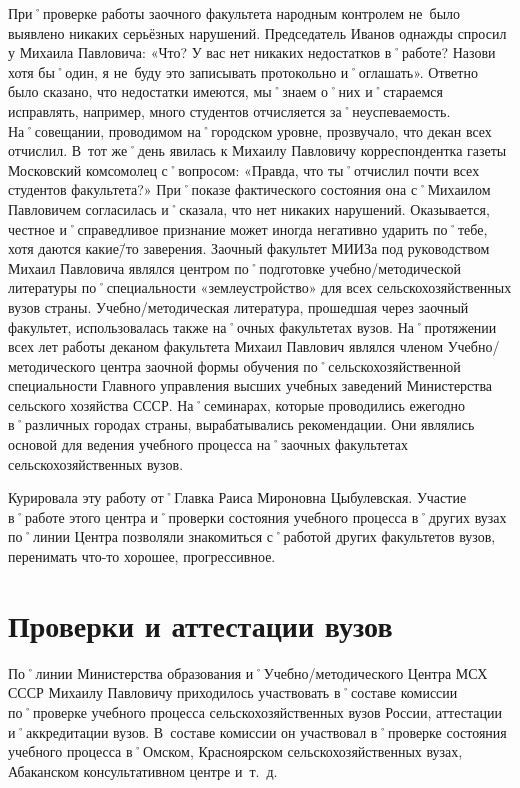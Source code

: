 При˚проверке работы заочного факультета народным контролем не~было выявлено никаких серьёзных нарушений. Председатель Иванов однажды спросил у Михаила Павловича: «Что? У вас нет никаких недостатков в˚работе? Назови хотя бы˚один, я не~буду это записывать протокольно и˚оглашать». Ответно было сказано, что недостатки имеются, мы˚знаем о˚них и˚стараемся исправлять, например, много  студентов отчисляется за˚неуспеваемость. На˚совещании, проводимом на˚городском уровне, прозвучало, что декан всех отчислил. В~тот же˚день явилась к Михаилу Павловичу корреспондентка газеты Московский комсомолец с˚вопросом: «Правда, что ты˚отчислил почти всех студентов факультета?» При˚показе фактического состояния она с˚Михаилом Павловичем согласилась и˚сказала, что нет никаких нарушений. Оказывается, честное и˚справедливое признание может иногда негативно ударить по˚тебе, хотя даются какие\=/то заверения. 
Заочный факультет МИИЗа под руководством Михаил Павловича являлся центром по˚подготовке учебно\-/методической литературы по˚специальности «землеустройство» для всех сельскохозяйственных вузов страны. Учебно\-/методическая литература, прошедшая через заочный факультет, использовалась также на˚очных факультетах вузов.
На˚протяжении всех лет работы деканом факультета Михаил Павлович являлся членом Учебно\-/методического центра заочной формы обучения по˚сельскохозяйственной специальности Главного управления высших учебных заведений Министерства сельского хозяйства СССР. На˚семинарах, которые проводились ежегодно в˚различных городах страны, вырабатывались рекомендации. Они являлись основой для ведения учебного процесса на˚заочных факультетах сельскохозяйственных вузов.

Курировала эту работу от˚Главка Раиса Мироновна Цыбулевская. Участие в˚работе этого центра и˚проверки состояния учебного процесса в˚других вузах по˚линии Центра позволяли знакомиться с˚работой других факультетов вузов, перенимать что-то хорошее, прогрессивное.

\section*{Проверки и аттестации вузов}
\label{sec:deskwork}

По˚линии Министерства образования и˚Учебно\-/методического Центра МСХ СССР Михаилу Павловичу приходилось  участвовать в˚составе комиссии по˚проверке учебного процесса сельскохозяйственных вузов России, аттестации и˚аккредитации вузов. В~составе комиссии он участвовал в˚проверке состояния учебного процесса в˚Омском, Красноярском сельскохозяйственных вузах, Абаканском консультативном центре и~т.~д.

